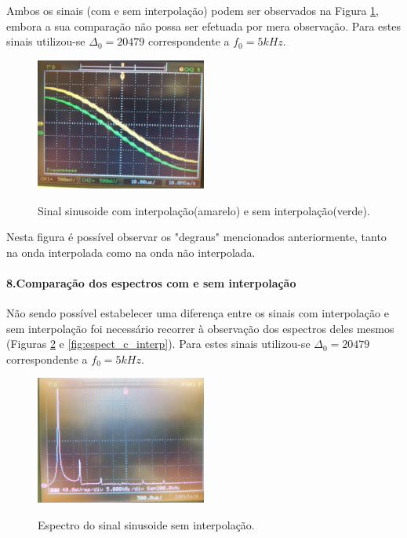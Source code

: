 \documentclass[11pt]{article}
\numberwithin{equation}{section}
\begin{document}
	Ambos os sinais (com e sem interpolação) podem ser observados na Figura \ref{fig:interp}, embora a sua comparação não possa ser efetuada por mera observação. Para estes sinais utilizou-se $\Delta_0=20479$ correspondente a $f_0=5kHz$.              
	\begin{figure}[H]
		\centering                                          
		\includegraphics[width=0.5\textwidth]{./P1_interp}~\\
		\caption{Sinal sinusoide com interpolação(amarelo) e sem interpolação(verde).}
		\label{fig:interp}
	\end{figure}
	
	Nesta figura é possível observar os "degraus" mencionados anteriormente, tanto na onda interpolada como na onda não interpolada.
	\paragraph{8.Comparação dos espectros com e sem interpolação} \hspace{0pt} \label{para:P1-8}
	
	Não sendo possível estabelecer uma diferença entre os sinais com interpolação e sem interpolação foi necessário recorrer à observação dos espectros deles mesmos (Figuras \ref{fig:espect_s_interp} e \ref{fig:espect_c_interp}). Para estes sinais utilizou-se $\Delta_0=20479$ correspondente a $f_0=5kHz$.
	\begin{figure}[H]
		\centering
		\includegraphics[width=0.5\textwidth]{./P1-8_espect_s_interp}~\\
		\caption{Espectro do sinal sinusoide sem interpolação.}
		\label{fig:espect_s_interp}
	\end{figure}
	
\end{document}

